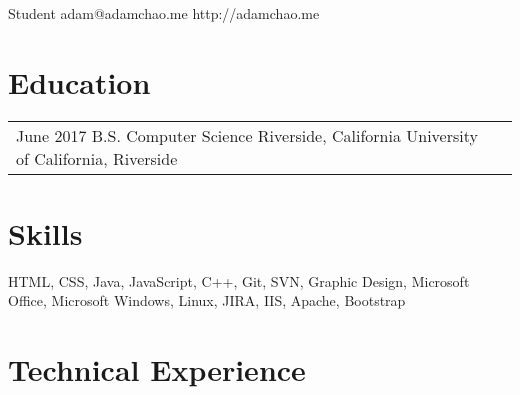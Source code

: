 \documentclass[print]{friggeri-cv} %
\makeatletter
\renewenvironment{entrylist}{%
\par\begin{tabular*}{\textwidth}{@{\extracolsep{\fill}}ll}
}{%
\end{tabular*}\par
}
\makeatother
\begin{document}

{Student}
{adam@adamchao.me}
{http://adamchao.me}

\hfill

\section{Education}
\begin{entrylist}
\entry
{June 2017}
{B.S. Computer Science}
{Riverside, California}
{University of California, Riverside}
\end{entrylist}


\section{Skills}
HTML, CSS, Java, JavaScript, C++, Git, SVN, Graphic Design, Microsoft Office, Microsoft Windows, Linux, JIRA, IIS, Apache, Bootstrap


\section{Technical Experience}
\end{document}

